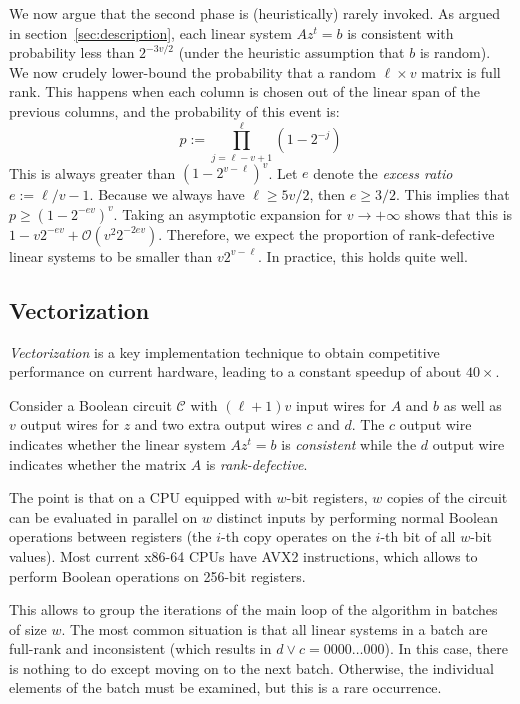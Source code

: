 \documentclass[twoside,leqno]{article}
\newcommand{\bigO}[1]{\ensuremath{\mathcal{O}\left( #1 \right)} }
\begin{document}
We now argue that the second phase is (heuristically) rarely invoked.  As argued
in section~\ref{sec:description}, each linear system $Az^t = b$ is consistent
with probability less than $2^{-3v/2}$ (under the heuristic assumption that $b$
is random). We now crudely lower-bound the probability that a random
$\ell \times v$ matrix is full rank. This happens when each column is chosen out
of the linear span of the previous columns, and the probability of this event
is:
\[
p := \prod_{j=\ell-v+1}^\ell \left(1 - 2^{-j} \right)
\]
This is always greater than $\left(1 - 2^{v-\ell} \right)^v$. Let $e$ denote the
\emph{excess ratio} $e := \ell/v - 1$. Because we always have $\ell \geq 5v/2$,
then $e \geq 3/2$. This implies that $p \geq \left(1 - 2^{-ev} \right)^v$. Taking
an asymptotic expansion for $v \rightarrow +\infty$ shows that this is
$1 - v 2^{-ev} + \bigO{v^2 2^{-2ev}}$. Therefore, we expect the proportion of
rank-defective linear systems to be smaller than $v 2^{v-\ell}$. In practice,
this holds quite well.

\subsection{Vectorization}

\emph{Vectorization} is a key implementation technique to obtain competitive
performance on current hardware, leading to a constant speedup of about
$40 \times$.

Consider a Boolean circuit $\mathcal{C}$ with $(\ell+1)v$ input wires for $A$
and $b$ as well as $v$ output wires for $z$ and two extra output wires $c$ and
$d$. The $c$ output wire indicates whether the linear system $A z^t = b$ is
\emph{consistent} while the $d$ output wire indicates whether the matrix $A$ is
\emph{rank-defective}.

The point is that on a CPU equipped with $w$-bit registers, $w$ copies of the
circuit can be evaluated in parallel on $w$ distinct inputs by performing normal
Boolean operations between registers (the $i$-th copy operates on the $i$-th bit
of all $w$-bit values). Most current \textsf{x86-64} CPUs have \textsf{AVX2}
instructions, which allows to perform Boolean operations on 256-bit registers.

This allows to group the iterations of the main loop of the algorithm in batches
of size $w$. The most common situation is that all linear systems in a batch are
full-rank and inconsistent (which results in $d \vee c = 0000 \dots 000$). In
this case, there is nothing to do except moving on to the next batch. Otherwise,
the individual elements of the batch must be examined, but this is a rare
occurrence.
\end{document}
